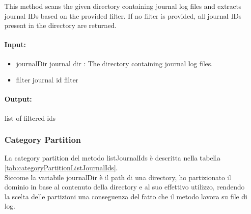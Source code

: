 \documentclass[12pt, a4paper]{article}
\begin{document}
This method scans the given directory containing journal log files and extracts
journal IDs based on the provided filter. If no filter is provided, all journal
IDs present in the directory are returned.


\paragraph{Input:}
\begin{itemize}
  \item journalDir journal dir : The directory containing journal log files.
  \item filter journal id filter
\end{itemize}
\paragraph{Output:}
    list of filtered ids

\subsubsection{Category Partition}

La category partition del metodo listJournalIds è descritta nella tabella \ref{tab:categoryPartitionListJournalIds}. \\
Siccome la variabile journalDir è il path di una directory, ho partizionato 
il dominio in base al contenuto della directory e al suo effettivo utilizzo, rendendo la scelta delle partizioni 
una conseguenza del fatto che il metodo lavora su file di log.
\end{document}

